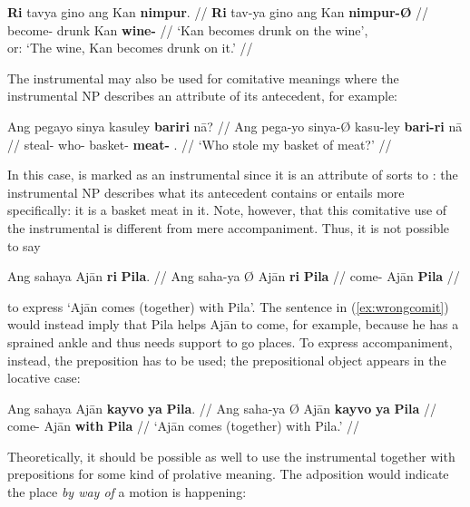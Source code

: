 \a\begingl
	\gla \textbf{Ri} tavya gino ang Kan \textbf{nimpur}. //
	\glb \textbf{Ri} tav-ya gino ang Kan \textbf{nimpur-Ø} //
	\glc \textbf{\InsT{}} become-\TsgM{} drunk \Aarg{} Kan 
		\textbf{wine-\Top{}} //
	\glft `Kan becomes drunk on the wine', \\
		or: `The wine, Kan becomes drunk on it.' //
\endgl

\xe

The instrumental may also be used for comitative meanings where the 
instrumental NP describes an attribute of its antecedent, for example:

\ex\begingl
	\gla Ang pegayo sinya kasuley \textbf{bariri} nā? //
	\glb Ang pega-yo sinya-Ø kasu-ley \textbf{bari-ri} nā //
	\glc \AgtT{} steal-\TsgN{} who-\Top{} basket-\PargI{} 
		\textbf{meat-\Ins{}} \Fsg{}.\Gen{} //
	\glft `Who stole my basket of meat?' //
\endgl\xe

In this case,  is marked as an instrumental since it is an 
attribute of sorts to : the instrumental NP describes what its 
antecedent contains or entails more specifically: it is a basket  meat 
in it. Note, however, that this comitative use of the instrumental is different 
from mere accompaniment. Thus, it is not possible to say

\ex\label{ex:wrongcomit}\begingl
	\gla *Ang sahaya {} Ajān \textbf{ri} \textbf{Pila}. //
	\glb Ang saha-ya Ø Ajān \textbf{ri} \textbf{Pila} //
	\glc \AgtT{} come-\TsgM{} \Top{} Ajān \textbf{\Ins{}} \textbf{Pila} //
\endgl\xe

\noindent to express `Ajān comes (together) with Pila'. The sentence in 
(\ref{ex:wrongcomit}) would instead imply that Pila helps Ajān to come, for 
example, because he has a sprained ankle and thus needs support to go places. 
To express accompaniment, instead, the preposition  has to be used; the prepositional object appears in the locative 
case:

\ex\begingl
	\gla Ang sahaya {} Ajān \textbf{kayvo} \textbf{ya} \textbf{Pila}. //
	\glb Ang saha-ya Ø Ajān \textbf{kayvo} \textbf{ya} \textbf{Pila} //
	\glc \AgtT{} come-\TsgM{} \Top{} Ajān \textbf{with} \textbf{\Loc{}} 
		\textbf{Pila} //
	\glft `Ajān comes (together) with Pila.' //
\endgl\xe

Theoretically, it should be possible as well to use the instrumental together 
with prepositions for some kind of prolative meaning. The adposition would 
indicate the place \emph{by way of} a motion is happening:

